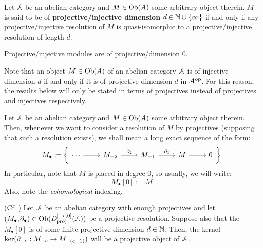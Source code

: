             \begin{definition} \label{def: projective_and_injective_dimensions}
                Let $\mathcal{A}$ be an abelian category and $M \in \mathrm{Ob}(\mathcal{A})$ some arbitrary object therein. $M$ is said to be of \textbf{projective/injective dimension} $d \in \mathbb{N} \cup \{\infty\}$ if and only if any projective/injective resolution of $M$ is quasi-isomorphic to a projective/injective resolution of length $d$.
            \end{definition}
            \begin{example}
                Projective/injective modules are of projective/dimension $0$.
            \end{example}
            \begin{remark}
                Note that an object $M \in \mathrm{Ob}(\mathcal{A})$ of an abelian category $\mathcal{A}$ is of injective dimension $d$ if and only if it is of projective dimension $d$ in $\mathcal{A}^{\mathrm{op}}$. For this reason, the results below will only be stated in terms of projectives instead of projectives and injectives respectively.
            \end{remark}
            \begin{convention}[Resolutions]
                Let $\mathcal{A}$ be an abelian category and $M \in \mathrm{Ob}(\mathcal{A})$ some arbitrary object therein. Then, whenever we want to consider a resolution of $M$ by projectives (supposing that such a resolution exists), we shall mean a long exact sequence of the form:
                    $$
                        M_{\bullet} :=
                        \left\{
                            \begin{tikzcd}
                            	\cdots & {M_{-2}} & {M_{-1}} & M & 0
                            	\arrow[from=1-1, to=1-2]
                            	\arrow["{\del_2}", from=1-2, to=1-3]
                            	\arrow["{\del_1}", from=1-3, to=1-4]
                            	\arrow[from=1-4, to=1-5]
                            \end{tikzcd}
                        \right\}
                    $$
                In particular, note that $M$ is placed in degree $0$, so usually, we will write:
                    $$M_{\bullet}[0] := M$$
                Also, note the \textit{cohomological} indexing.
            \end{convention}
            \begin{lemma}
                (Cf. \cite[\href{https://stacks.math.columbia.edu/tag/00O5}{Tag 00O5}]{stacks}) Let $\mathcal{A}$ be an abelian category with enough projectives and let $(M_{\bullet}, \partial_{\bullet}) \in \mathrm{Ob}(D^{[-e, 0]}_{\mathrm{proj}}(\mathcal{A}))$ be a projective resolution. Suppose also that the $M_{\bullet}[0]$ is of some finite projective dimension $d \in \mathbb{N}$. Then, the kernel $\ker(\partial_{-e}: M_{-e} \to M_{-(e - 1)})$ will be a projective object of $\mathcal{A}$.
            \end{lemma}
